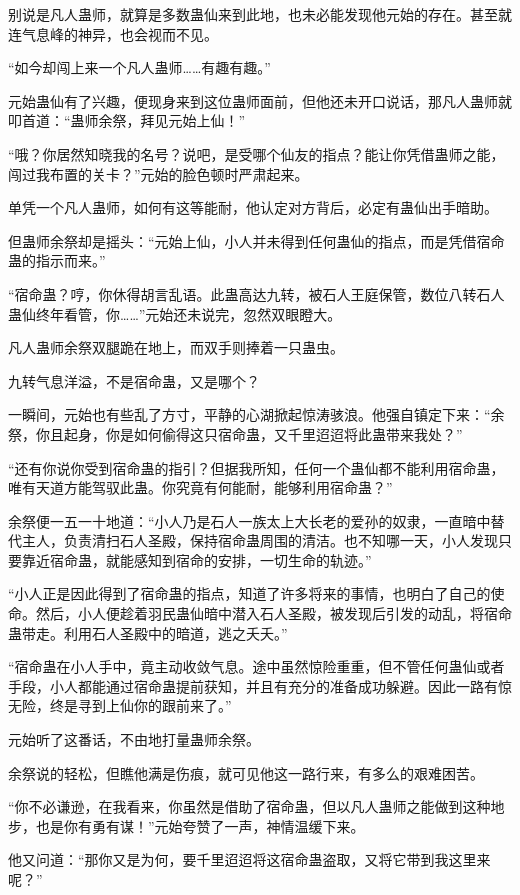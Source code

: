 \begin{this_body}
别说是凡人蛊师，就算是多数蛊仙来到此地，也未必能发现他元始的存在。甚至就连气息峰的神异，也会视而不见。

“如今却闯上来一个凡人蛊师……有趣有趣。”

元始蛊仙有了兴趣，便现身来到这位蛊师面前，但他还未开口说话，那凡人蛊师就叩首道：“蛊师余祭，拜见元始上仙！”

“哦？你居然知晓我的名号？说吧，是受哪个仙友的指点？能让你凭借蛊师之能，闯过我布置的关卡？”元始的脸色顿时严肃起来。

单凭一个凡人蛊师，如何有这等能耐，他认定对方背后，必定有蛊仙出手暗助。

但蛊师余祭却是摇头：“元始上仙，小人并未得到任何蛊仙的指点，而是凭借宿命蛊的指示而来。”

“宿命蛊？哼，你休得胡言乱语。此蛊高达九转，被石人王庭保管，数位八转石人蛊仙终年看管，你……”元始还未说完，忽然双眼瞪大。

凡人蛊师余祭双腿跪在地上，而双手则捧着一只蛊虫。

九转气息洋溢，不是宿命蛊，又是哪个？

一瞬间，元始也有些乱了方寸，平静的心湖掀起惊涛骇浪。他强自镇定下来：“余祭，你且起身，你是如何偷得这只宿命蛊，又千里迢迢将此蛊带来我处？”

“还有你说你受到宿命蛊的指引？但据我所知，任何一个蛊仙都不能利用宿命蛊，唯有天道方能驾驭此蛊。你究竟有何能耐，能够利用宿命蛊？”

余祭便一五一十地道：“小人乃是石人一族太上大长老的爱孙的奴隶，一直暗中替代主人，负责清扫石人圣殿，保持宿命蛊周围的清洁。也不知哪一天，小人发现只要靠近宿命蛊，就能感知到宿命的安排，一切生命的轨迹。”

“小人正是因此得到了宿命蛊的指点，知道了许多将来的事情，也明白了自己的使命。然后，小人便趁着羽民蛊仙暗中潜入石人圣殿，被发现后引发的动乱，将宿命蛊带走。利用石人圣殿中的暗道，逃之夭夭。”

“宿命蛊在小人手中，竟主动收敛气息。途中虽然惊险重重，但不管任何蛊仙或者手段，小人都能通过宿命蛊提前获知，并且有充分的准备成功躲避。因此一路有惊无险，终是寻到上仙你的跟前来了。”

元始听了这番话，不由地打量蛊师余祭。

余祭说的轻松，但瞧他满是伤痕，就可见他这一路行来，有多么的艰难困苦。

“你不必谦逊，在我看来，你虽然是借助了宿命蛊，但以凡人蛊师之能做到这种地步，也是你有勇有谋！”元始夸赞了一声，神情温缓下来。

他又问道：“那你又是为何，要千里迢迢将这宿命蛊盗取，又将它带到我这里来呢？”


\end{this_body}
